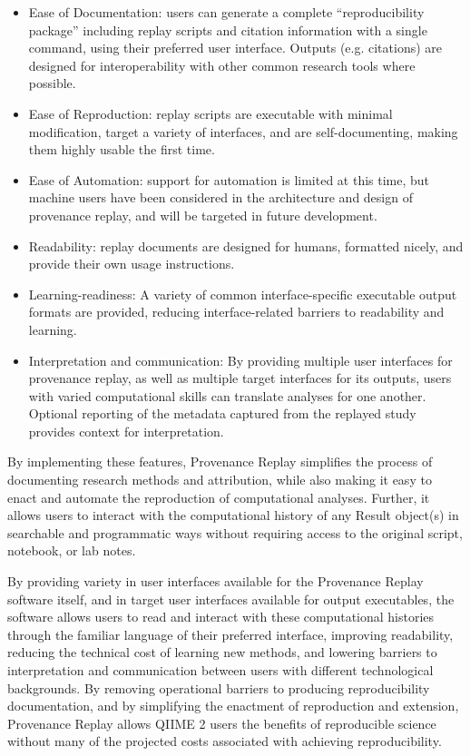 \begin{itemize}
    \item Ease of Documentation: users can generate a complete “reproducibility
        package” including replay scripts and citation information with a single
        command, using their preferred user interface. Outputs (e.g. citations) are
        designed for interoperability with other common research tools where
        possible.
    \item Ease of Reproduction: replay scripts are executable with minimal
        modification, target a variety of interfaces, and are self-documenting,
        making them highly usable the first time.
    \item Ease of Automation: support for automation is limited at this time,
        but machine users have been considered in the architecture and design of
        provenance replay, and will be targeted in future development.
    \item Readability: replay documents are designed for humans, formatted
        nicely, and provide their own usage instructions.
    \item Learning-readiness: A variety of common interface-specific executable
        output formats are provided, reducing interface-related barriers to
        readability and learning.
    \item Interpretation and communication: By providing multiple user
        interfaces for provenance replay, as well as multiple target interfaces for
        its outputs, users with varied computational skills can translate analyses
        for one another. Optional reporting of the metadata captured from the
        replayed study provides context for interpretation.
\end{itemize}

By implementing these features, Provenance Replay simplifies the process of
documenting research methods and attribution, while also making it easy to enact
and automate the reproduction of computational analyses. Further, it allows
users to interact with the computational history of any Result object(s) in
searchable and programmatic ways without requiring access to the original
script, notebook, or lab notes.

By providing variety in user interfaces available for the Provenance Replay
software itself, and in target user interfaces available for output executables,
the software allows users to read and interact with these computational
histories through the familiar language of their preferred interface, improving
readability, reducing the technical cost of learning new methods, and lowering
barriers to interpretation and communication between users with different
technological backgrounds. By removing operational barriers to producing
reproducibility documentation, and by simplifying the enactment of reproduction
and extension, Provenance Replay allows QIIME 2 users the benefits of
reproducible science without many of the projected costs associated with
achieving reproducibility.

